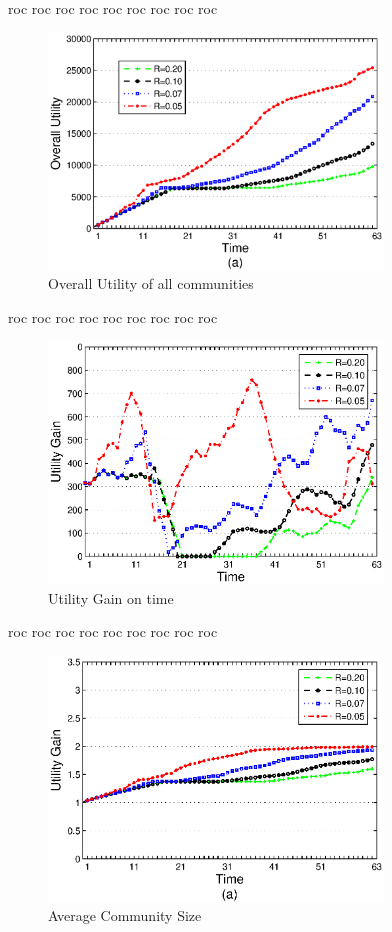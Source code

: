 \documentclass[10pt,journal,cspaper,compsoc]{IEEEtran}
\begin{document}
roc roc roc
roc roc roc
roc roc roc

\begin{figure}%
\centering
\includegraphics[width=3.5in]{figures/stats1.eps}
\caption{Overall Utility of all communities}
\label{stats1}
\end{figure}

roc roc roc
roc roc roc
roc roc roc

\begin{figure}%
\centering
\includegraphics[width=3.5in]{figures/stats2.eps}
\caption{Utility Gain on time}
\label{stats2}
\end{figure}

roc roc roc
roc roc roc
roc roc roc

\begin{figure}%
\centering
\includegraphics[width=3.5in]{figures/stats3.eps}
\caption{Average Community Size}
\label{stats3}
\end{figure}
\end{document}
